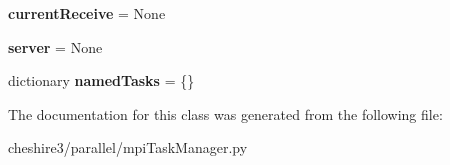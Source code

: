 \begin{DoxyCompactItemize}
\item 
\hypertarget{classcheshire3_1_1parallel_1_1mpi_task_manager_1_1_task_manager_af32624680abbc833a8611b067faa76b9}{{\bfseries current\-Receive} = None}\label{classcheshire3_1_1parallel_1_1mpi_task_manager_1_1_task_manager_af32624680abbc833a8611b067faa76b9}

\item 
\hypertarget{classcheshire3_1_1parallel_1_1mpi_task_manager_1_1_task_manager_ab95565d559abbb0a858593bd0b4e8a83}{{\bfseries server} = None}\label{classcheshire3_1_1parallel_1_1mpi_task_manager_1_1_task_manager_ab95565d559abbb0a858593bd0b4e8a83}

\item 
\hypertarget{classcheshire3_1_1parallel_1_1mpi_task_manager_1_1_task_manager_a0aa2e60c4563eedfe47e44acecbda906}{dictionary {\bfseries named\-Tasks} = \{\}}\label{classcheshire3_1_1parallel_1_1mpi_task_manager_1_1_task_manager_a0aa2e60c4563eedfe47e44acecbda906}

\end{DoxyCompactItemize}


The documentation for this class was generated from the following file\-:\begin{DoxyCompactItemize}
\item 
cheshire3/parallel/mpi\-Task\-Manager.\-py\end{DoxyCompactItemize}
